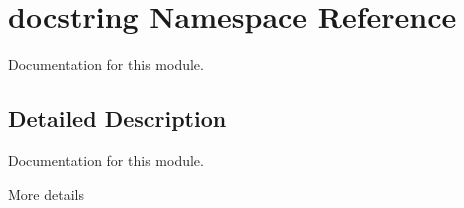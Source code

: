 \hypertarget{namespacedocstring}{}\section{docstring Namespace Reference}
\label{namespacedocstring}


Documentation for this module.  




\subsection{Detailed Description}
Documentation for this module. 

More details 